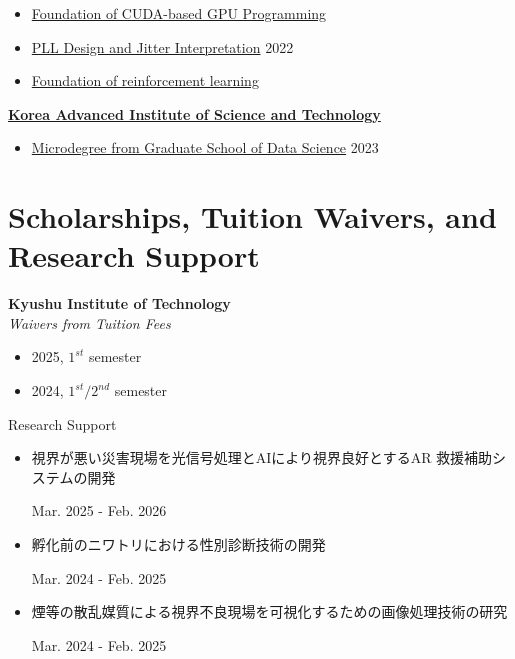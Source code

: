 \documentclass[a4paper,9pt]{extarticle}
\begin{document}
\begin{itemize}
    \item \href{https://github.com/user-attachments/assets/0fc8c167-bef1-4857-a664-a1b82c95e306}{Foundation of CUDA-based GPU Programming}    
    \vspace{0.5em}             
    \item \href{https://github.com/user-attachments/assets/b4e013f1-d7b8-4505-a4f5-12e270097549}{PLL Design and Jitter Interpretation}                                  \hfill 2022
    \item \href{https://github.com/user-attachments/assets/73933790-2b15-46ae-8ac2-c6eaf31d9e01}{Foundation of reinforcement learning}                                  
\end{itemize}


\noindent
\textbf{\href{https://www.kocw.net/home/index.do}{Korea Advanced Institute of Science and Technology}}
\begin{itemize}
    \item \href{https://github.com/user-attachments/assets/b404e1df-2798-48de-8385-c9a6c7389b38}{Microdegree from Graduate School of Data Science}                    \hfill 2023
\end{itemize}


\section*{Scholarships, Tuition Waivers, and Research Support}
\noindent
\textbf{Kyushu Institute of Technology} \\
\textit{Waivers from Tuition Fees}
\begin{itemize}
    \item 2025, $1^{st}$ semester 
    \item 2024, $1^{st} / 2^{nd}$ semester 
\end{itemize} 
\noindent
Research Support
\begin{itemize}
    \item 
    \begin{CJK}{UTF8}{min}
        視界が悪い災害現場を光信号処理とAIにより視界良好とするAR 救援補助システムの開発
    \end{CJK} \hfill Mar. 2025 - Feb. 2026 
    \item 
    \begin{CJK}{UTF8}{min}
        孵化前のニワトリにおける性別診断技術の開発
    \end{CJK} \hfill Mar. 2024 - Feb. 2025 
    \item 
    \begin{CJK}{UTF8}{min}
        煙等の散乱媒質による視界不良現場を可視化するための画像処理技術の研究
    \end{CJK} \hfill Mar. 2024 - Feb. 2025 
\end{itemize}
\end{document}
